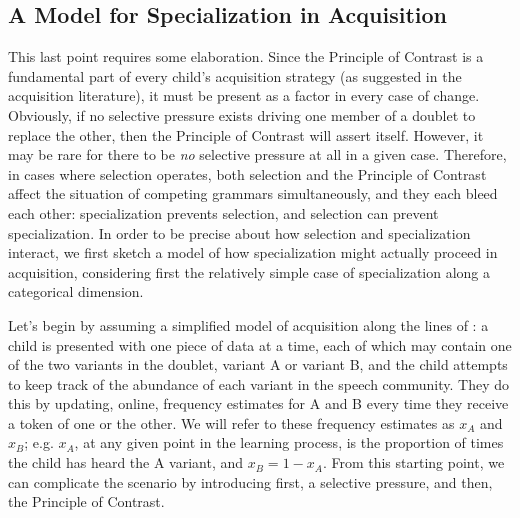 \subsection{A Model for Specialization in Acquisition}
\label{catspec}

This last point requires some elaboration.
Since the Principle of Contrast is a fundamental part of every child's acquisition strategy (as suggested in the acquisition literature), it must be present as a factor in every case of change.
Obviously, if no selective pressure exists driving one member of a doublet to replace the other, then the Principle of Contrast will assert itself.
However, it may be rare for there to be \textsl{no} selective pressure at all in a given case.
Therefore, in cases where selection operates, both selection and the Principle of Contrast affect the situation of competing grammars simultaneously, and they each bleed each other: specialization prevents selection, and selection can prevent specialization.
In order to be precise about how selection and specialization interact, we first sketch a model of how specialization might actually proceed in acquisition, considering first the relatively simple case of specialization along a categorical dimension.

Let's begin by assuming a simplified model of acquisition along the lines of \citet{yang2000,yang2002}: a child is presented with one piece of data at a time, each of which may contain one of the two variants in the doublet, variant A or variant B, and the child attempts to keep track of the abundance of each variant in the speech community.
They do this by updating, online, frequency estimates for A and B every time they receive a token of one or the other.
We will refer to these frequency estimates as $x_A$ and $x_B$; e.g. $x_A$, at any given point in the learning process, is the proportion of times the child has heard the A variant, and $x_B = 1-x_A$.
From this starting point, we can complicate the scenario by introducing first, a selective pressure, and then, the Principle of Contrast.

